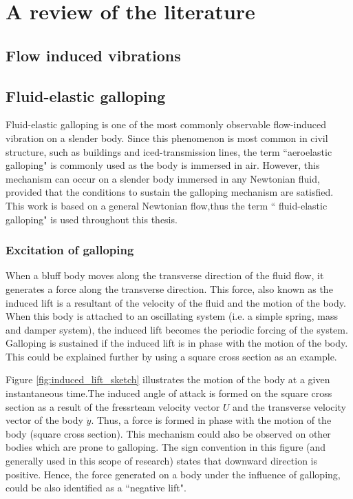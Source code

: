\chapter{A review of the literature}

\section{Flow induced vibrations}
\label{sec:flow induced vibrations}


\section{Fluid-elastic galloping}
\label{fluid-elastic galloping}

Fluid-elastic galloping is one of the most commonly observable flow-induced vibration on a slender body. Since this phenomenon is most common in civil structure, such as buildings and iced-transmission lines, the term ``aeroelastic galloping" is commonly used as the body is immersed in air. However, this mechanism can occur on a slender body immersed in any Newtonian fluid, provided that the conditions to sustain the galloping mechanism are satisfied. This work is based on a general Newtonian flow,thus the term `` fluid-elastic galloping" is used throughout this thesis.
   

\subsection{Excitation of galloping}
\label{exci-galloping}

When a bluff body moves along the transverse direction of the fluid flow, it generates a force along the transverse direction. This force, also known as the induced lift is a resultant of the velocity of the fluid and the motion of the body. When this body is attached to an oscillating system (i.e. a simple spring, mass and damper system), the induced lift becomes the periodic forcing of the system. Galloping is sustained  if the induced lift is in phase with the motion of the body. This could be explained further by using a square cross section as an example.



 Figure \ref{fig:induced_lift_sketch}  illustrates the motion of the body at a given instantaneous time.The induced angle of attack is formed on the square cross section as a result of the fressrteam velocity vector $U$ and the transverse velocity vector of the body $\dot{y}$. Thus, a force is formed in phase with the motion of the body (square cross section). This mechanism could also be observed on other bodies which are prone to galloping. The sign convention in this figure (and generally used in this scope of research) states that downward direction is positive. Hence, the force generated on a body under the influence of galloping, could be also identified as a ``negative lift".
 

